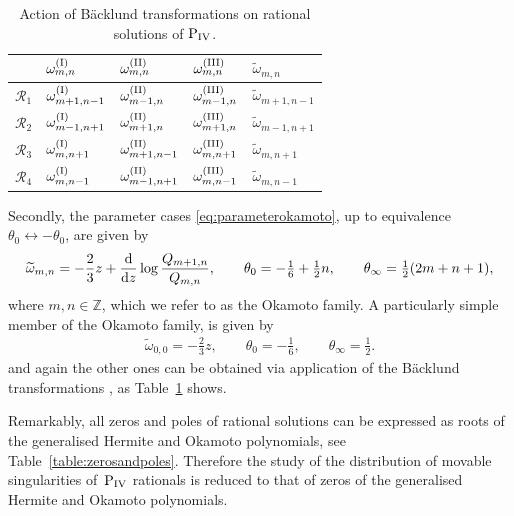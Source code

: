 \documentclass[pdftex]{sigma}
\numberwithin{equation}{section}
\begin{document}
{\renewcommand{\arraystretch}{1.4}
	\begin{table}[t]
		\centering
		\begin{tabular}{l || l l l | l }
			& $\omega_{m,n}^{({\rm I})}$ & $\omega_{m,n}^{({\rm II})}$ & $\omega_{m,n}^{({\rm III})}$ & $\widetilde{\omega}_{m,n}$\\
			\hline\hline
			$\mathcal{R}_1$ & $\omega_{m+1,n-1}^{({\rm I})}$ & $\omega_{m-1,n}^{({\rm II})}$ & $\omega_{m-1,n}^{({\rm III})}$ & $\widetilde{\omega}_{m+1,n-1}$\\
			$\mathcal{R}_2$ & $\omega_{m-1,n+1}^{({\rm I})}$ & $\omega_{m+1,n}^{({\rm II})}$ & $\omega_{m+1,n}^{({\rm III})}$ & $\widetilde{\omega}_{m-1,n+1}$\\
			$\mathcal{R}_3$ & $\omega_{m,n+1}^{({\rm I})}$ & $\omega_{m+1,n-1}^{({\rm II})}$ & $\omega_{m,n+1}^{({\rm III})}$ & $\widetilde{\omega}_{m,n+1}$\\
			$\mathcal{R}_4$ & $\omega_{m,n-1}^{({\rm I})}$ & $\omega_{m-1,n+1}^{({\rm II})}$ & $\omega_{m,n-1}^{({\rm III})}$ & $\widetilde{\omega}_{m,n-1}$
		\end{tabular}
		\caption{Action of B\"acklund transformations on rational solutions of ${\rm P}_{\rm IV}$.}		\label{table:bthermite}
	\end{table}}

Secondly, the parameter cases \eqref{eq:parameterokamoto}, up to equivalence $\theta_0\leftrightarrow -\theta_0$, are given by
\begin{gather}
\widetilde{\omega}_{m,n}=-\frac{2}{3}z+\frac{{\rm d}}{{\rm d}z}\log\frac{Q_{m+1,n}}{Q_{m,n}}, \qquad \theta_0=-\tfrac{1}{6}+\tfrac{1}{2}n,
\qquad \theta_\infty=\tfrac{1}{2}(2m+n+1),	\label{eq:okamotorationals}
\end{gather}
where $m,n\in\mathbb{Z}$, which we refer to as the Okamoto family. A particularly simple member of the Okamoto family, is given by
\begin{gather*}
\widetilde{\omega}_{0,0}=-\tfrac{2}{3}z, \qquad \theta_0=-\tfrac{1}{6}, \qquad \theta_\infty=\tfrac{1}{2}.%
\end{gather*}
and again the other ones can be obtained via application of the B\"acklund transformations , as Table~\ref{table:bthermite} shows.

Remarkably, all zeros and poles of rational solutions can be expressed as roots of the gene\-ralised Hermite and Okamoto polynomials,
see Table~\ref{table:zerosandpoles}. Therefore the study of the distribution of movable singularities of~${\rm P}_\text{IV}$ rationals
is reduced to that of zeros of the generalised Hermite and Okamoto polynomials.
\end{document}
